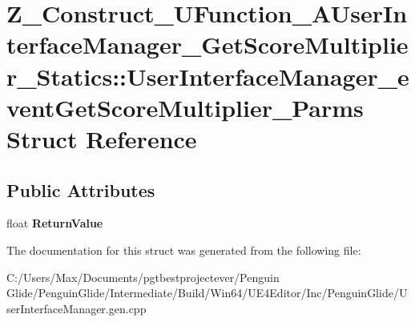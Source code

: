 \hypertarget{struct_z___construct___u_function___a_user_interface_manager___get_score_multiplier___statics_1_bba7889cd91eda4060ac59fe48f862d0}{}\section{Z\+\_\+\+Construct\+\_\+\+U\+Function\+\_\+\+A\+User\+Interface\+Manager\+\_\+\+Get\+Score\+Multiplier\+\_\+\+Statics\+::User\+Interface\+Manager\+\_\+event\+Get\+Score\+Multiplier\+\_\+\+Parms Struct Reference}
\label{struct_z___construct___u_function___a_user_interface_manager___get_score_multiplier___statics_1_bba7889cd91eda4060ac59fe48f862d0}
\subsection*{Public Attributes}
\begin{DoxyCompactItemize}
\item 
\mbox{\label{struct_z___construct___u_function___a_user_interface_manager___get_score_multiplier___statics_1_bba7889cd91eda4060ac59fe48f862d0_a7d4f363f426714d52555c592ab2ad2f2}} 
float {\bfseries Return\+Value}
\end{DoxyCompactItemize}


The documentation for this struct was generated from the following file\+:\begin{DoxyCompactItemize}
\item 
C\+:/\+Users/\+Max/\+Documents/pgtbestprojectever/\+Penguin Glide/\+Penguin\+Glide/\+Intermediate/\+Build/\+Win64/\+U\+E4\+Editor/\+Inc/\+Penguin\+Glide/User\+Interface\+Manager.\+gen.\+cpp\end{DoxyCompactItemize}
